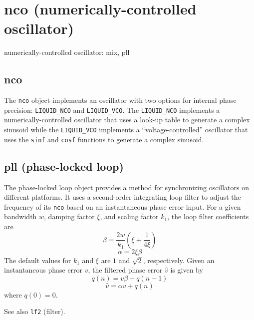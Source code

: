 % 
%

\section{nco (numerically-controlled oscillator)}
\label{module:nco}
numerically-controlled oscillator: mix, pll

\subsection{{nco}}
\label{module:nco:nco}
The {\tt nco} object implements an oscillator with two options for internal
phase precision: {\tt LIQUID\_NCO} and {\tt LIQUID\_VCO}.
The {\tt LIQUID\_NCO} implements a numerically-controlled oscillator that uses
a look-up table to generate a complex sinusoid while
the {\tt LIQUID\_VCO} implements a ``voltage-controlled'' oscillator that uses
the {\tt sinf} and {\tt cosf} functions to generate a complex sinusoid.

\subsection{{pll} (phase-locked loop)}
\label{module:nco:pll}
The phase-locked loop object provides a method for synchronizing oscillators
on different platforms.
It uses a second-order integrating loop filter to adjust the frequency of its
{\tt nco} based on an instantaneous phase error input.
For a given bandwidth $w$, damping factor $\xi$, and scaling factor $k_1$,
the loop filter coefficients are
\[  \beta = \frac{2w}{k_1} \left(\xi + \frac{1}{4\xi} \right)   \]
\[  \alpha = 2 \xi \beta    \]
The default values for $k_1$ and $\xi$ are $1$ and $\sqrt{2}$, respectively.
Given an instantaneous phase error $v$, the filtered phase error $\hat{v}$ is
given by
\[  q(n) = v \beta + q(n-1)     \]
\[  \hat{v} = \alpha v + q(n)   \]
where $q(0)=0$.

See also {\tt lf2} (filter).
